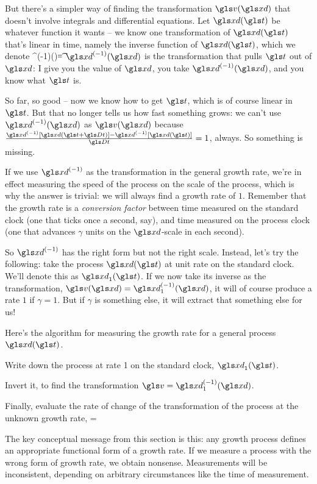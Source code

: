 But there's a simpler way of finding the transformation $\gv(\xd)$ that doesn't involve integrals and differential equations. Let $\xd(\t)$ be whatever function it wants -- we know one transformation of $\xd(\t)$ that's linear in time, namely the inverse function of $\xd(\t)$, which we denote 
\be
\xd^{(-1)}(\xd)=\t
\ee
$\xd^{(-1)}(\xd)$ is the transformation that pulls $\t$ out of $\xd$: I give you the value of $\xd$, you take $\xd^{(-1)}(\xd)$, and you know what $\t$ is.

So far, so good -- now we know how to get $\t$, which is of course linear in $\t$. But that no longer tells us how fast something grows: we can't use $\xd^{(-1)}(\xd)$ as $\gv(\xd)$ because $\frac{\xd^{(-1)}[\xd(\t+\Dt)]-\xd^{(-1)}[\xd(\t)]}{\Dt}=1$, always. So something is missing.

If we use $\xd^{(-1)}$ as the transformation in the general growth rate, we're in effect measuring the speed of the process on the scale of the process, which is why the answer is trivial: we will always find a growth rate of $1$.  Remember that the growth rate is a {\it conversion factor} between time measured on the standard clock (one that ticks once a second, say), and time measured on the process clock (one that advances $\gamma$ units on the $\xd$-scale in each second). 

So $\xd^{(-1)}$ has the right form but not the right scale. Instead, let's try the following: take the process $\xd(\t)$ at unit rate on the standard clock. We'll denote this as $\xd_1(\t)$. If we now take its inverse as the transformation,  $\gv(\xd)=\xd_1^{(-1)}(\xd)$, it will of course produce a rate $1$ if $\gamma=1$. But if $\gamma$ is something else, it will extract that something else for us!

Here's the algorithm for measuring the growth rate for a general process $\xd(\t)$.
\bi
\item
Write down the process at rate 1 on the standard clock, $\xd_1(\t)$.
\item
Invert it, to find the transformation $\gv=\xd_1^{(-1)}(\xd)$.
\item
Finally, evaluate the rate of change of the transformation of the process at the unknown growth rate, 
\be
\g=
\ee
\ei

The key conceptual message from this section is this: any growth process defines an appropriate functional form of a growth rate. If we measure a process with the wrong form of growth rate, we obtain nonsense. Measurements will be inconsistent, depending on arbitrary circumstances like the time of measurement. 

